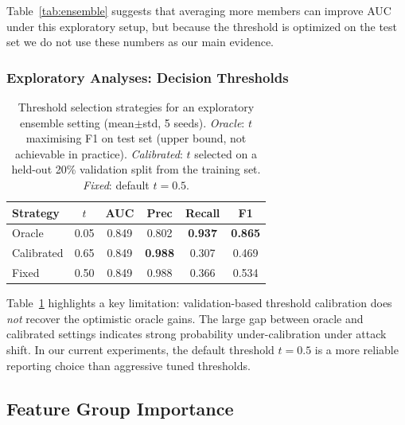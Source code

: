﻿\documentclass[sigconf,review,anonymous]{acmart}
\begin{document}
Table~\ref{tab:ensemble} suggests that averaging more members can improve AUC
under this exploratory setup, but because the threshold is optimized on the
test set we do not use these numbers as our main evidence.

\subsubsection{Exploratory Analyses: Decision Thresholds}

\begin{table}[t]
\centering
\caption{Threshold selection strategies for an exploratory ensemble setting
(mean$\pm$std, 5 seeds).
\emph{Oracle}: $t$ maximising F1 on test set (upper bound, not achievable in practice).
\emph{Calibrated}: $t$ selected on a held-out 20\% validation split from the training set.
\emph{Fixed}: default $t{=}0.5$.}
\label{tab:threshold}
\small
\begin{tabular}{lccccc}
\toprule
Strategy & $t$ & AUC & Prec & Recall & F1 \\
\midrule
Oracle      & 0.05 & 0.849 & 0.802 & \textbf{0.937} & \textbf{0.865} \\
Calibrated  & 0.65 & 0.849 & \textbf{0.988} & 0.307 & 0.469 \\
Fixed       & 0.50 & 0.849 & 0.988 & 0.366 & 0.534 \\
\bottomrule
\end{tabular}
\end{table}

Table~\ref{tab:threshold} highlights a key limitation: validation-based
threshold calibration does \emph{not} recover the optimistic oracle gains.
The large gap between oracle and calibrated settings indicates strong
probability under-calibration under attack shift. In our current experiments,
the default threshold $t{=}0.5$ is a more reliable reporting choice than
aggressive tuned thresholds.

\subsection{Feature Group Importance}
\label{sec:exp:feat}
\end{document}
